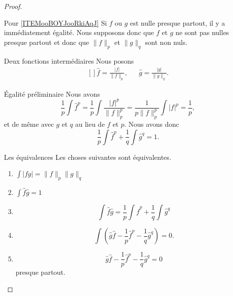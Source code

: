 \begin{proof}
\begin{subproof}
		\item[Pour \ref{ITEMooBOYJooRkiAqJ}]
		Si \( f\) ou \( g\) est nulle presque partout, il y a immédiatement égalité. Nous supposons donc que \( f\) et \( g\) ne sont pas nulles presque partout et donc que \( \| f \|_p\) et \( \| g \|_q\) sont non nuls.
		\begin{subproof}
			\item[Deux fonctions intermédiaires]
			Nous posons
			\begin{equation}
				\begin{aligned}[]
					\hat f=\frac{ | f | }{ \| f \|_p }, &  & \hat g=\frac{ | g | }{ \| g \|_q }.
				\end{aligned}
			\end{equation}
			\item[Égalité préliminaire]
			Nous avons
			\begin{equation}
				\frac{1}{ p }\int\hat f^p=\frac{1}{ p }\int\frac{ | f |^p }{ \| f \|_p^p }=\frac{1}{ p\| f \|_p^p }\int| f |^p=\frac{1}{ p },
			\end{equation}
			et de même avec \( g\) et \( q\) au lieu de \( f\) et \( p\). Nous avons donc
			\begin{equation}
				\frac{1}{ p }\int\hat f^p+\frac{1}{ q }\int\hat g^q=1.
			\end{equation}
			\item[Les équivalences]
			Les choses suivantes sont équivalentes.
			\begin{enumerate}
				\item
				      \( \int | fg |=\| f \|_p\| g \|_q\)
				\item
				      $\int\hat f\hat g=1$
				\item
				      \begin{equation}
					      \int\hat f\hat g=\frac{1}{ p }\int \hat f^p+\frac{1}{ q }\int\hat g^q
				      \end{equation}
				\item
				      \begin{equation}
					      \int\left( \hat g\hat f-\frac{1}{ p }\hat f^p-\frac{1}{ q }\hat g^q \right)=0.
				      \end{equation}
				\item
				      \begin{equation}
					      \hat g\hat f-\frac{1}{ p }\hat f^p-\frac{1}{ q }\hat g^q=0
				      \end{equation}
				      presque partout.


\end{enumerate}
\end{subproof}
\end{subproof}
\end{proof}
